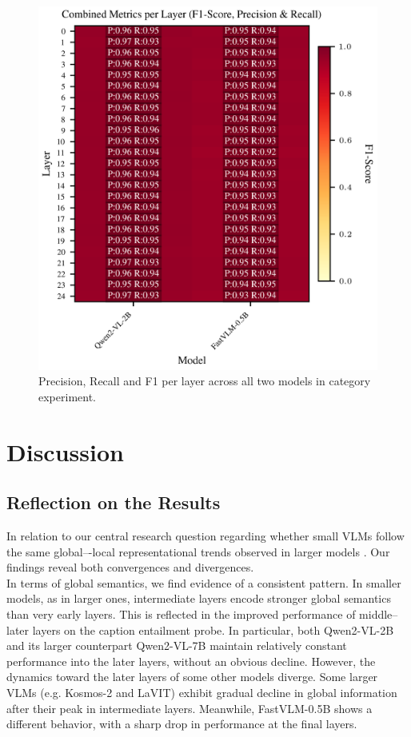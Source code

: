 \documentclass[11pt]{article}
\begin{document}
\begin{figure}[H]
    \centering
    \includegraphics[width=1\linewidth]{figures/local/_combined_exp2/combined_metrics_heatmap.png}
    \caption{Precision, Recall and F1 per layer across all two models in category experiment.}
    \label{fig:combined_metrics_per_layer_local}
\end{figure}


\section{Discussion}
\subsection{Reflection on the Results}
In relation to our central research question regarding whether small VLMs follow the same global–-local representational trends observed in larger models \cite{tao2024probingmultimodallargelanguage}.
Our findings reveal both convergences and divergences.\\

In terms of global semantics, we find evidence of a consistent pattern.
In smaller models, as in larger ones, intermediate layers encode stronger global semantics than very early layers.
This is reflected in the improved performance of middle–later layers on the caption entailment probe.
In particular, both Qwen2-VL-2B and its larger counterpart Qwen2-VL-7B maintain relatively constant performance into the later layers, without an obvious decline.
However, the dynamics toward the later layers of some other models diverge.
Some larger VLMs (e.g. Kosmos-2 and LaVIT) exhibit gradual decline in global information after their peak in intermediate layers.
Meanwhile, FastVLM-0.5B shows a different behavior, with a sharp drop in performance at the final layers.\\
\end{document}
